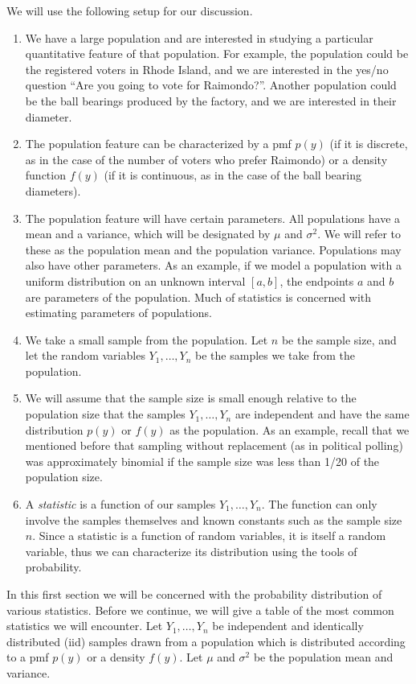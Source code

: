 \documentclass[12pt]{article}
\theoremstyle{definition}
\theoremstyle{remark}
\begin{document}
We will use the following setup for our discussion.
\begin{enumerate}
\item We have a large population and are interested in studying a particular quantitative feature of that population. For example, the population could be the registered voters in Rhode Island, and we are interested in the yes/no question ``Are you going to vote for Raimondo?''. Another population could be the ball bearings produced by the factory, and we are interested in their diameter.
\item The population feature can be characterized by a pmf $p(y)$ (if it is discrete, as in the case of the number of voters who prefer Raimondo) or a density function $f(y)$ (if it is continuous, as in the case of the ball bearing diameters).
\item The population feature will have certain parameters. All populations have a mean and a variance, which will be designated by $\mu$ and $\sigma^2$. We will refer to these as the population mean and the population variance. Populations may also have other parameters. As an example, if we model a population with a uniform distribution on an unknown interval $[a, b]$, the endpoints $a$ and $b$ are parameters of the population. Much of statistics is concerned with estimating parameters of populations.
\item We take a small sample from the population. Let $n$ be the sample size, and let the random variables $Y_1, \dots, Y_n$ be the samples we take from the population. 
\item We will assume that the sample size is small enough relative to the population size that the samples $Y_1, \dots, Y_n$ are independent and have the same distribution $p(y)$ or $f(y)$ as the population. As an example, recall that we mentioned before that sampling without replacement (as in political polling) was approximately binomial if the sample size was less than 1/20 of the population size.
\item A \emph{statistic} is a function of our samples $Y_1, \dots, Y_n$. The function can only involve the samples themselves and known constants such as the sample size $n$. Since a statistic is a function of random variables, it is itself a random variable, thus we can characterize its distribution using the tools of probability. 
\end{enumerate}
In this first section we will be concerned with the probability distribution of various statistics. Before we continue, we will give a table of the most common statistics we will encounter. Let $Y_1, \dots, Y_n$ be independent and identically distributed (iid) samples drawn from a population which is distributed according to a pmf $p(y)$ or a density $f(y)$. Let $\mu$ and $\sigma^2$ be the population mean and variance.
\end{document}
